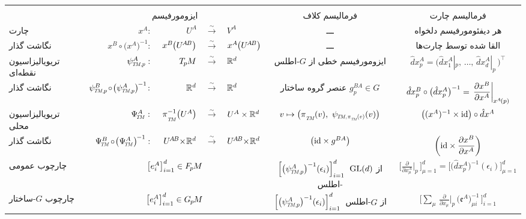 \def\arraystretch{2.75}%
\setlength\tabcolsep{2.8ex}
\small
\begin{tabular}{ @{\ \ } l r@{\,}r@{\ }c@{\ }l cc @{\ \ } }
	\toprule
	\\[-8.0ex]
	& \multicolumn{4}{c}{ایزومورفیسم}
	& فرمالیسم کلاف
	& فرمالیسم چارت \\
	\midrule[0.07em] %
	چارت
	& $x^A :\ $
	& $U^A$
	& $\xrightarrow{\sim}$
	& $V^A$
	& ـــ
	& هر دیفئومورفیسم دلخواه
	\\
	نگاشت گذار
	& $x^B \!\circ\! \big(x^A\big)^{-1} :\ $
	& $x^B \mkern-1mu\big( U^{\mkern-2muA\mkern-2muB} \big)$
	& $\xrightarrow{\sim}$
	& $x^A \mkern-1mu\big( U^{\mkern-2muA\mkern-2muB} \big)$
	& ـــ
	& القا شده توسط چارت‌ها
	\\
	\midrule[0.04em] %
	تریویالیزاسیون نقطه‌ای \hspace*{-3ex}
	& $\psiTMp^A :\ $
	& $T_{\mkern-1.5mu p}\mkern-.5muM$
	& $\xrightarrow{\sim}$
	& $\mathbb{R}^d$
	& ایزومورفیسم خطی از $G$-اطلس
	& $\hat{d}x^A_p = \big( \hat{d}x^A_1|_p,\, \dots,\, \hat{d}x^A_d|_p\, \big)^{\!\top}$
	\\
	نگاشت گذار
	& $\psiTMp^B \mkern-2mu\circ\! \big(\psiTMp^A\big)^{\mkern-2mu-1} \!:\ $
	& $\mathbb{R}^d$
	& $\xrightarrow{\sim}$
	& $\mathbb{R}^d$
	& عنصر گروه ساختار $g_p^{BA} \in G$
	& $\hat{d}x^B_p \circ \big(\hat{d}x^A_p\big)^{-1}
	=\, \displaystyle \frac{\partial x^B}{\partial x^A} \bigg|_{\mkern-1mu x^{\mkern-1mu A}\mkern-2mu(p)} $
	\\
	\midrule[0.04em] %
	تریویالیزاسیون محلی
	& $\PsiTM^A :\ $
	& $\piTM^{-1} \big(U^A\big)$
	& $\xrightarrow{\sim}$
	& $U^A \times \mathbb{R}^d$
	& $v \mapsto \big( \piTM\mkern-1mu(v),\ \psiTMpiv(v) \big)$
	& $\big((x^A)^{-1} \times \mathrm{id}\big) \circ \hat{d}x^A$
	\\
	نگاشت گذار
	& $\PsiTM^B \mkern-2mu\circ\! \big(\PsiTM^A\big)^{\mkern-2mu-1} :\ $
	& $U^{\mkern-2muA\mkern-2muB} \mkern-4mu\times\! \mathbb{R}^d$
	& $\xrightarrow{\sim}$
	& $U^{\mkern-2muA\mkern-2muB} \mkern-4mu\times\! \mathbb{R}^d$
	& $\big(\mathrm{id} \times g^{BA} \big)$
	& $\displaystyle \bigg( \mathrm{id} \times \frac{\partial x^B}{\partial x^A} \bigg)$
	\\
	\midrule[0.07em] %
	چارچوب عمومی
	& \multicolumn{4}{c}{$\big[ e^A_i \big]_{i=1}^d \in F_{\mkern-1.5mu p}\mkern-1.0muM$}
	& $\Big[ \big(\psiTMp^A\big)^{-1} (\epsilon_i) \Big]_{i=1}^d$\ از $\operatorname{GL}(d)$-اطلس
	& $\displaystyle \bigg[\frac{\partial}{\partial x^A_\mu} \bigg|_p \,\bigg]_{\mu=1}^d = \Big[ \big(\hat{d}x^A_p \big)^{-1} (\epsilon_i) \Big]_{\mu=1}^d$
	\\
	چارچوب $G$-ساختار
	& \multicolumn{4}{c}{$\big[ e^A_i \big]_{i=1}^d \in G_{\mkern-1.3mu p}\mkern-1.2muM$}
	& $\Big[ \big(\psiTMp^A\big)^{-1} (\epsilon_i) \Big]_{i=1}^d$\ از $G$-اطلس \kern16pt
	& $\displaystyle \bigg[\sum\nolimits_{\mu}\, \frac{\partial}{\partial x_\mu} \bigg|_p\, \big( \mathfrak{e}^A \big)^{-1}_{\!\mu i}\, \bigg]_{i=1}^d$
	\\
	\bottomrule
\end{tabular}